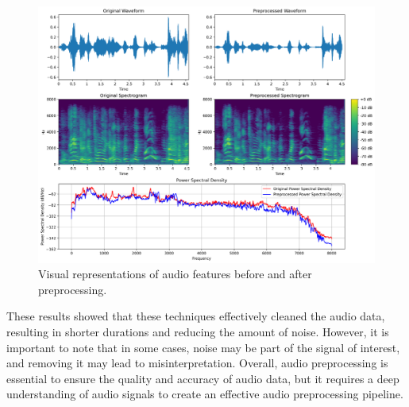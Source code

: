 \begin{figure}[H]
	\centering
	\includegraphics[width=\textwidth]{figs/4_2_preprocessing/preprocessing.png}
	\caption{Visual representations of audio features before and after preprocessing.}
	\label{fig:prep}
\end{figure}


These results showed that these techniques effectively cleaned the audio data, resulting in shorter durations and reducing the amount of noise. However, it is important to note that in some cases, noise may be part of the signal of interest, and removing it may lead to misinterpretation. Overall, audio preprocessing is essential to ensure the quality and accuracy of audio data, but it requires a deep understanding of audio signals to create an effective audio preprocessing pipeline.
